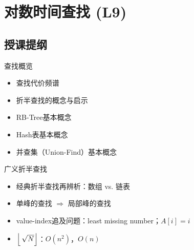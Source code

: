 \chapter{对数时间查找 (L9)}

\section*{授课提纲}

\nid 查找概览
\begin{itemize}
    \item 查找代价频谱
    \item 折半查找的概念与启示
    \item RB-Tree基本概念
    \item Hash表基本概念
    \item 并查集（Union-Find）基本概念
\end{itemize}

\nid 广义折半查找
\begin{itemize}
    \item 经典折半查找再辨析：数组 vs. 链表
    \item 单峰的查找 $\Rightarrow$ 局部峰的查找
    \item value-index追及问题：least missing number；$A[i]=i$
    \item $\left \lfloor\,\sqrt{N} \right \rfloor$：$O(n^2)$，$O(n)$
\end{itemize}

